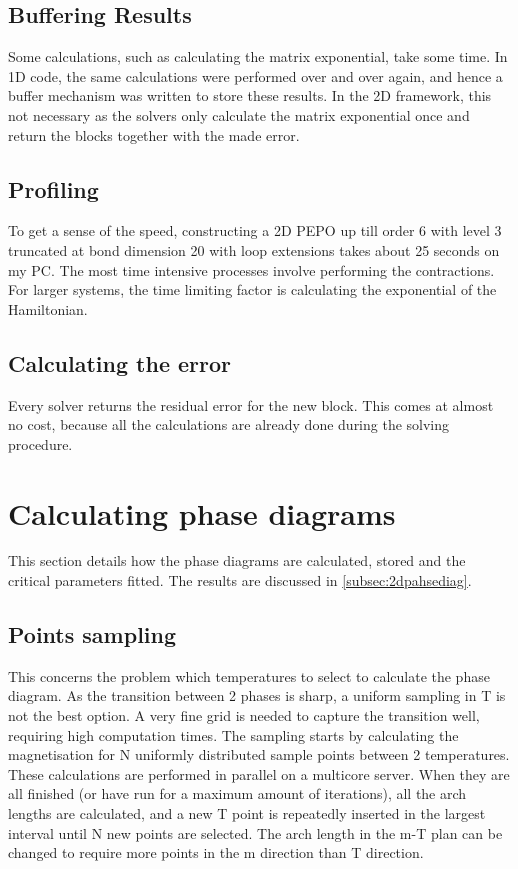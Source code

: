 \subsection{Buffering Results}

Some calculations, such as calculating the matrix exponential, take some time. In 1D code, the same calculations were performed over and over again, and hence a buffer mechanism was written to store these results. In the 2D framework, this not necessary as the solvers only calculate the matrix exponential once and return the blocks together with the made error.

\subsection{Profiling}
To get a sense of the speed, constructing a 2D PEPO up till order 6 with level 3 truncated at bond dimension 20 with loop extensions takes about 25 seconds on my PC. The most time intensive processes involve performing the contractions. For larger systems, the time limiting factor is calculating the exponential of the Hamiltonian.

\subsection{Calculating the error}

Every solver returns the residual error for the new block. This comes at almost no cost, because all the calculations are already done during the solving procedure.

\section{Calculating phase diagrams} \label{sec:phase_diag}

This section details how the phase diagrams are calculated, stored and the critical parameters fitted. The results are discussed in \cref{subsec:2dpahsediag}.

\subsection{Points sampling}

This concerns the problem which temperatures to select to calculate the phase diagram. As  the transition between 2 phases is sharp, a uniform sampling in T is not the best option. A very fine grid is needed to capture the transition well, requiring high computation times. The sampling starts by calculating the magnetisation for N  uniformly distributed sample points between 2 temperatures. These calculations are performed in parallel on a multicore server. When they are all finished (or have run for a maximum amount of iterations), all the arch lengths are calculated, and a new T point is  repeatedly inserted in the largest interval until N new points are selected. The arch length in the m-T plan can be changed to require more points in the m direction than T direction.

